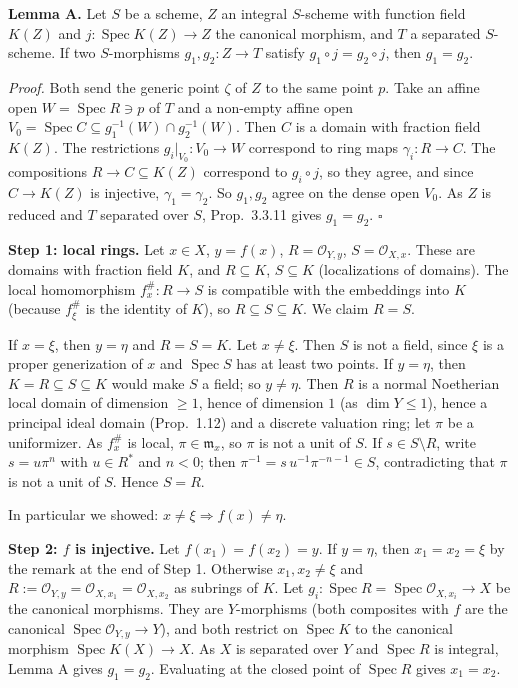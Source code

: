 \documentclass[11pt]{article}
\begin{document}
\textbf{Lemma A.} Let $S$ be a scheme, $Z$ an integral $S$-scheme with function field $K(Z)$ and $j:\operatorname{Spec}K(Z)\to Z$ the canonical morphism, and $T$ a separated $S$-scheme. If two $S$-morphisms $g_1,g_2:Z\to T$ satisfy $g_1\circ j=g_2\circ j$, then $g_1=g_2$.

\emph{Proof.} Both send the generic point $\zeta$ of $Z$ to the same point $p$. Take an affine open $W=\operatorname{Spec}R\ni p$ of $T$ and a non-empty affine open $V_0=\operatorname{Spec}C\subseteq g_1^{-1}(W)\cap g_2^{-1}(W)$. Then $C$ is a domain with fraction field $K(Z)$. The restrictions $g_i|_{V_0}:V_0\to W$ correspond to ring maps $\gamma_i:R\to C$. The compositions $R\to C\subseteq K(Z)$ correspond to $g_i\circ j$, so they agree, and since $C\to K(Z)$ is injective, $\gamma_1=\gamma_2$. So $g_1,g_2$ agree on the dense open $V_0$. As $Z$ is reduced and $T$ separated over $S$, Prop.~3.3.11 gives $g_1=g_2$. $\square$

\textbf{Step 1: local rings.} Let $x\in X$, $y=f(x)$, $R=\mathcal O_{Y,y}$, $S=\mathcal O_{X,x}$. These are domains with fraction field $K$, and $R\subseteq K$, $S\subseteq K$ (localizations of domains). The local homomorphism $f^\#_x:R\to S$ is compatible with the embeddings into $K$ (because $f^\#_\xi$ is the identity of $K$), so $R\subseteq S\subseteq K$. We claim $R=S$.

If $x=\xi$, then $y=\eta$ and $R=S=K$. Let $x\ne\xi$. Then $S$ is not a field, since $\xi$ is a proper generization of $x$ and $\operatorname{Spec}S$ has at least two points. If $y=\eta$, then $K=R\subseteq S\subseteq K$ would make $S$ a field; so $y\ne\eta$. Then $R$ is a normal Noetherian local domain of dimension $\ge1$, hence of dimension $1$ (as $\dim Y\le1$), hence a principal ideal domain (Prop.~1.12) and a discrete valuation ring; let $\pi$ be a uniformizer. As $f^\#_x$ is local, $\pi\in\mathfrak m_x$, so $\pi$ is not a unit of $S$. If $s\in S\setminus R$, write $s=u\pi^n$ with $u\in R^*$ and $n<0$; then $\pi^{-1}=s\,u^{-1}\pi^{-n-1}\in S$, contradicting that $\pi$ is not a unit of $S$. Hence $S=R$.

In particular we showed: $x\ne\xi\Rightarrow f(x)\ne\eta$.

\textbf{Step 2: $f$ is injective.} Let $f(x_1)=f(x_2)=y$. If $y=\eta$, then $x_1=x_2=\xi$ by the remark at the end of Step 1. Otherwise $x_1,x_2\neq\xi$ and $R:=\mathcal O_{Y,y}=\mathcal O_{X,x_1}=\mathcal O_{X,x_2}$ as subrings of $K$. Let $g_i:\operatorname{Spec}R=\operatorname{Spec}\mathcal O_{X,x_i}\to X$ be the canonical morphisms. They are $Y$-morphisms (both composites with $f$ are the canonical $\operatorname{Spec}\mathcal O_{Y,y}\to Y$), and both restrict on $\operatorname{Spec}K$ to the canonical morphism $\operatorname{Spec}K(X)\to X$. As $X$ is separated over $Y$ and $\operatorname{Spec}R$ is integral, Lemma A gives $g_1=g_2$. Evaluating at the closed point of $\operatorname{Spec}R$ gives $x_1=x_2$.
\end{document}

